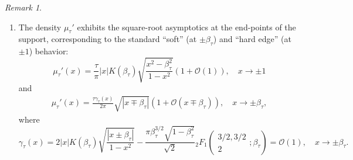 \documentclass[reqno,11pt]{amsart}
\theoremstyle{plain}
\theoremstyle{definition}
\theoremstyle{remark}
\newtheorem{remark}[theorem]{Remark}
\numberwithin{equation}{section}
\begin{document}
\begin{remark}
\begin{enumerate}
\begin{align*}
     \end{align*}
     and
     \begin{align*}
         C^{\mu_\tau}(z)&=\tau z\left(\frac{z^2-\beta_\tau^2}{z^2-1}\right)^{1/2}\left(K(\beta_\tau)+\frac{1-z^2}{z^2}\Pi\left(\frac{\beta_\tau^2}{z^2},     \beta_\tau\right)\right)-\frac{\tau}{2}\log\left(\frac{z+1}{z-1}\right).
     \end{align*}
\item[\textit{(iii)}] The density $\mu_\tau'$ exhibits the square-root asymptotics at the end-points of the support, corresponding to the standard ``soft'' (at $\pm \beta_\tau$) and ``hard edge'' (at $\pm 1$) behavior:
    \[\mu_\tau'(x)=\frac{\tau}{\pi}|x|K(\beta_\tau)\sqrt{\frac{x^2-\beta_\tau^2}{1-x^2}}\left(1+\mathcal{O}\left(1\right)\right),\quad x\to\pm1\]
    and
    \begin{align*}
        \mu_\tau'(x)=\frac{\tau\gamma_\tau(x)}{2\pi}\sqrt{|x\mp\beta_\tau|}\left(1+\mathcal{O}(x\mp\beta_\tau)\right),\quad x\to\pm\beta_\tau,
    \end{align*}
    where
\[
\gamma_\tau(x)=2|x|K(\beta_\tau)\sqrt{\frac{|x\pm \beta_\tau|}{1-x^2}}-\frac{\pi\beta_\tau^{3/2}\sqrt{1-\beta_\tau^2}}{\sqrt{2}}{}_2F_1 \left(\begin{array}{c} 3/2, 3/2 \\ 2
    \end{array}; \beta_\tau\right)=\mathcal{O}(1),\quad x\to\pm\beta_\tau.\]
    \end{enumerate}
\end{remark}
\end{document}
